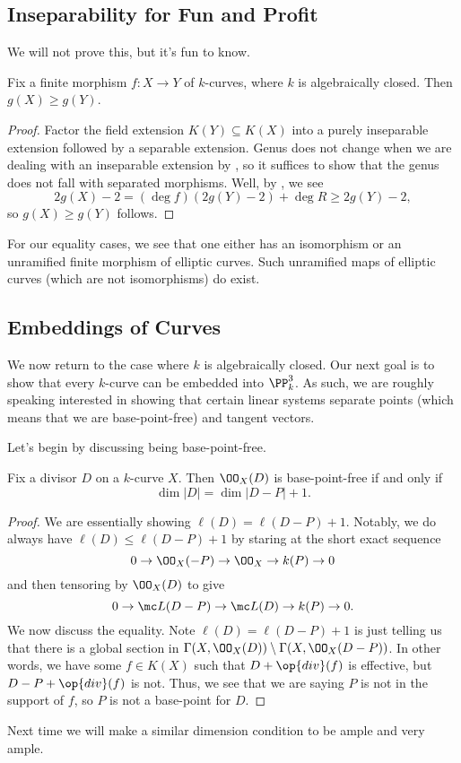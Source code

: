 \documentclass[../notes.tex]{subfiles}
\begin{document}
\subsection{Inseparability for Fun and Profit}
We will not prove this, but it's fun to know.
\begin{corollary}
	Fix a finite morphism $f\colon X\to Y$ of $k$-curves, where $k$ is algebraically closed. Then $g(X)\ge g(Y)$.
\end{corollary}
\begin{proof}
	Factor the field extension $K(Y)\subseteq K(X)$ into a purely inseparable extension followed by a separable extension. Genus does not change when we are dealing with an inseparable extension by , so it suffices to show that the genus does not fall with separated morphisms. Well, by , we see
	\[2g(X)-2=(\deg f)(2g(Y)-2)+\deg R\ge2g(Y)-2,\]
	so $g(X)\ge g(Y)$ follows.
\end{proof}
\begin{remark}
	For our equality cases, we see that one either has an isomorphism or an unramified finite morphism of elliptic curves. Such unramified maps of elliptic curves (which are not isomorphisms) do exist.
\end{remark}

\subsection{Embeddings of Curves}
We now return to the case where $k$ is algebraically closed. Our next goal is to show that every $k$-curve can be embedded into $\PP^3_k$. As such, we are roughly speaking interested in showing that certain linear systems separate points (which means that we are base-point-free) and tangent vectors.

Let's begin by discussing being base-point-free.
\begin{lemma}
	Fix a divisor $D$ on a $k$-curve $X$. Then $\OO_X(D)$ is base-point-free if and only if
	\[\dim|D|=\dim|D-P|+1.\]
\end{lemma}
\begin{proof}
	We are essentially showing $\ell(D)=\ell(D-P)+1$. Notably, we do always have $\ell(D)\le\ell(D-P)+1$ by staring at the short exact sequence
	\[0\to\OO_X(-P)\to\OO_X\to k(P)\to0\]
	and then tensoring by $\OO_X(D)$ to give
	\[0\to\mc L(D-P)\to\mc L(D)\to k(P)\to0.\]
	We now discuss the equality. Note $\ell(D)=\ell(D-P)+1$ is just telling us that there is a global section in $\Gamma(X,\OO_X(D))\setminus\Gamma(X,\OO_X(D-P))$. In other words, we have some $f\in K(X)$ such that $D+\op{div}(f)$ is effective, but $D-P+\op{div}(f)$ is not. Thus, we see that we are saying $P$ is not in the support of $f$, so $P$ is not a base-point for $D$.
\end{proof}
Next time we will make a similar dimension condition to be ample and very ample.
\end{document}

